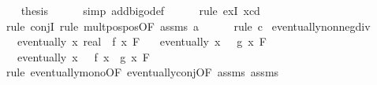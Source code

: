 \begin{isabellebody}
\ \ \isamarkupfalse%
\ {\isacharquery}{\kern0pt}thesis\isanewline
\ \ \ \ \isamarkupfalse%
\ {\isacharparenleft}{\kern0pt}simp\ add{\isacharcolon}{\kern0pt}bigo{\isacharunderscore}{\kern0pt}def{\isacharparenright}{\kern0pt}\isanewline
\ \ \ \ \isamarkupfalse%
\ {\isacharparenleft}{\kern0pt}rule\ exI{\isacharbrackleft}{\kern0pt}\ x{\isacharequal}{\kern0pt}{\isachardoublequoteopen}c{\isacharasterisk}{\kern0pt}d{\isachardoublequoteclose}{\isacharbrackright}{\kern0pt}{\isacharparenright}{\kern0pt}\isanewline
\ \ \ \ \isamarkupfalse%
\ {\isacharparenleft}{\kern0pt}rule\ conjI{\isacharcomma}{\kern0pt}\ rule\ mult{\isacharunderscore}{\kern0pt}pos{\isacharunderscore}{\kern0pt}pos{\isacharbrackleft}{\kern0pt}OF\ assms{\isacharparenleft}{\kern0pt}{}{\isacharparenright}{\kern0pt}\ a{\isacharbrackright}{\kern0pt}{\isacharparenright}{\kern0pt}\isanewline
\ \ \ \ \isamarkupfalse%
\ {\isacharparenleft}{\kern0pt}rule\ c{\isacharparenright}{\kern0pt}\isanewline
{}\isamarkupfalse%
%
\endisatagproof
{\isafoldproof}%
%
\isadelimproof
\isanewline
%
\endisadelimproof
\isanewline
{}\isamarkupfalse%
\ eventually{\isacharunderscore}{\kern0pt}nonneg{\isacharunderscore}{\kern0pt}div{\isacharcolon}{\kern0pt}\isanewline
\ \ \ {\isachardoublequoteopen}eventually\ {\isacharparenleft}{\kern0pt}{\isasymlambda}x{\isachardot}{\kern0pt}\ {\isacharparenleft}{\kern0pt}{}{\isacharcolon}{\kern0pt}{\isacharcolon}{\kern0pt}real{\isacharparenright}{\kern0pt}\ {\isasymle}\ f\ x{\isacharparenright}{\kern0pt}\ F{\isacharprime}{\kern0pt}{\isachardoublequoteclose}\isanewline
\ \ \ {\isachardoublequoteopen}eventually\ {\isacharparenleft}{\kern0pt}{\isasymlambda}x{\isachardot}{\kern0pt}\ {}\ {\isacharless}{\kern0pt}\ g\ x{\isacharparenright}{\kern0pt}\ F{\isacharprime}{\kern0pt}{\isachardoublequoteclose}\isanewline
\ \ \ {\isachardoublequoteopen}eventually\ {\isacharparenleft}{\kern0pt}{\isasymlambda}x{\isachardot}{\kern0pt}\ {}\ {\isasymle}\ f\ x\ {\isacharslash}{\kern0pt}\ g\ x{\isacharparenright}{\kern0pt}\ F{\isacharprime}{\kern0pt}{\isachardoublequoteclose}\isanewline
%
\isadelimproof
\ \ %
\endisadelimproof
%
\isatagproof
{}\isamarkupfalse%
\ {\isacharparenleft}{\kern0pt}rule\ eventually{\isacharunderscore}{\kern0pt}mono{\isacharbrackleft}{\kern0pt}OF\ eventually{\isacharunderscore}{\kern0pt}conj{\isacharbrackleft}{\kern0pt}OF\ assms{\isacharparenleft}{\kern0pt}{}{\isacharparenright}{\kern0pt}\ assms{\isacharparenleft}{\kern0pt}{}{\isacharparenright}{\kern0pt}{\isacharbrackright}{\kern0pt}{\isacharbrackright}{\kern0pt}{\isacharparenright}{\kern0pt}\isanewline

\end{isabellebody}

